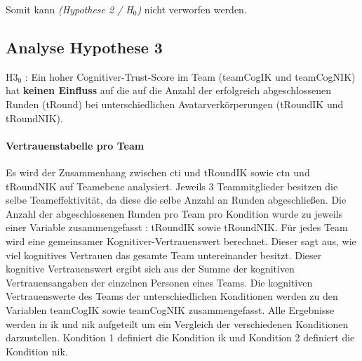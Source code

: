 \documentclass[a4paper,11pt]{article}%
\renewcommand{\\}{\vspace*{0.5\baselineskip} \newline}
\begin{document}
Somit kann \textit{(Hypothese 2 / H$_{0}$)} nicht verworfen werden.

\newpage
\subsection{Analyse Hypothese 3}
H3$_{0}$ : Ein hoher Cognitiver-Trust-Score im Team (\ac{teamCogIK} und \ac{teamCogNIK}) hat \textbf{keinen Einfluss} auf die auf die Anzahl der erfolgreich abgeschlossenen Runden (\ac{tRound}) bei unterschiedlichen Avatarverkörperungen (\ac{tRoundIK} und \ac{tRoundNIK}).

\paragraph{Vertrauenstabelle pro Team}
Es wird der Zusammenhang zwischen \ac{cti} und \ac{tRoundIK} sowie \ac{ctn} und \ac{tRoundNIK} auf Teamebene analysiert.
Jeweils 3 Teammitglieder besitzen die selbe Teameffektivität, da diese die selbe Anzahl an Runden abgeschließen. Die Anzahl der abgeschlossenen Runden pro Team pro Kondition wurde zu jeweils einer Variable zusammengefasst : \ac{tRoundIK} sowie \ac{tRoundNIK}. Für jedes Team wird eine gemeinsamer Kognitiver-Vertrauenswert berechnet. Dieser sagt aus, wie viel kognitives Vertrauen das gesamte Team untereinander besitzt. Dieser kognitive Vertrauenswert ergibt sich aus der Summe der kognitiven Vertrauensangaben der einzelnen Personen eines Teams. Die kognitiven Vertrauenswerte des Teams der unterschiedlichen Konditionen werden zu den Variablen \ac{teamCogIK} sowie \ac{teamCogNIK} zusammengefasst.
Alle Ergebnisse werden in \ac{ik} und \ac{nik} aufgeteilt um ein Vergleich der verschiedenen Konditionen darzustellen. Kondition 1 definiert die Kondition \ac{ik} und Kondition 2 definiert die Kondition \ac{nik}.
\end{document}
